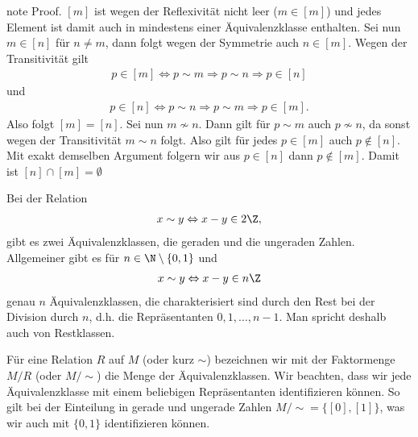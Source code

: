 \documentclass[letterpaper,10pt,english]{jupyterBook}
\begin{document}
\begin{sphinxadmonition}{note}
Proof.  \([m]\) ist wegen der Reflexivität nicht leer (\(m \in [m]\)) und jedes Element ist damit auch in mindestens einer Äquivalenzklasse enthalten. Sei nun \(m \in [n]\) für \(n \neq m\), dann folgt wegen der Symmetrie auch \(n \in [m]\). Wegen der Transitivität gilt
\begin{equation*}
\begin{split}p \in [m] \Leftrightarrow p \sim m \Rightarrow p \sim n \Rightarrow p \in [n]\end{split}
\end{equation*}
und
\begin{equation*}
\begin{split} p \in [n] \Leftrightarrow p \sim n \Rightarrow p \sim m \Rightarrow p \in [m].\end{split}
\end{equation*}
Also folgt \([m]=[n]\). Sei nun \(m \not\sim n\). Dann gilt für \(p \sim m\) auch \(p \not\sim n\), da sonst wegen der Transitivität \(m \sim n\) folgt. Also gilt für jedes \(p \in [m]\) auch \(p \notin [n]\). Mit exakt demselben Argument folgern wir aus \(p \in [n]\) dann \(p \notin [m]\). Damit ist \([n] \cap [m] = \emptyset\)
\end{sphinxadmonition}

Bei der Relation
\begin{equation*}
\begin{split} x \sim y \Leftrightarrow x-y \in 2 \Z ,\end{split}
\end{equation*}
gibt es zwei Äquivalenzklassen, die geraden und die ungeraden Zahlen. Allgemeiner gibt es für \(n \in \N \setminus \{0,1\}\) und
\begin{equation*}
\begin{split}x \sim y \Leftrightarrow x - y \in n \Z\end{split}
\end{equation*}
genau \(n\) Äquivalenzklassen, die charakterisiert sind durch den Rest bei der Division durch \(n\), d.h. die Repräsentanten \(0,1,\ldots,n-1\). Man spricht deshalb auch von Restklassen.

Für eine Relation \(R\) auf \(M\) (oder kurz \(\sim\)) bezeichnen wir mit der Faktormenge \(M/R\) (oder \(M/\sim\)) die Menge der Äquivalenzklassen. Wir beachten, dass wir jede Äquivalenzklasse mit einem beliebigen Repräsentanten identifizieren können. So gilt bei der Einteilung in gerade und ungerade Zahlen \(M/\sim = \{[0],[1]\}\), was wir auch mit \(\{0,1\}\) identifizieren können.
\end{document}
